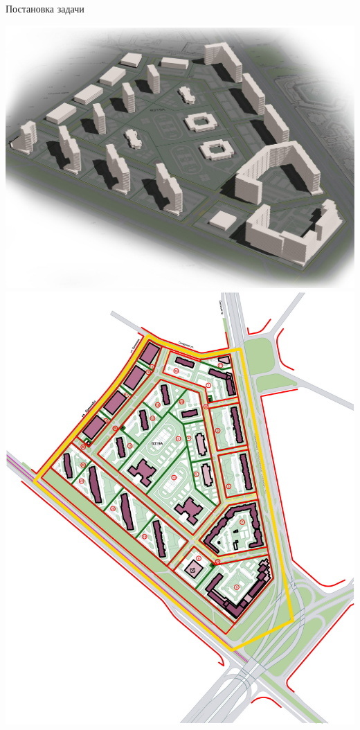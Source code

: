 \documentclass[14pt, fleqn, xcolor={dvipsnames, table}]{beamer}
\begin{document}
        \begin{frame}{Постановка задачи}
            \begin{center}
                \includegraphics[scale=0.065]{3d.jpg} 
                \includegraphics[scale=0.28]{fill.jpg}
            \end{center}                 
        \end{frame}
        
\end{document}
